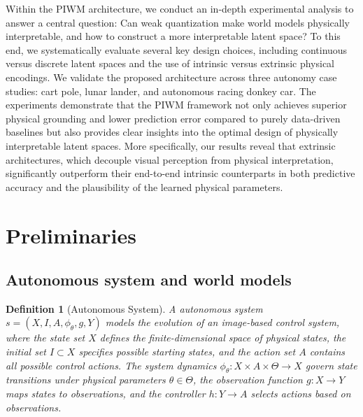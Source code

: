 \documentclass[sigconf]{acmart}
\newtheorem{definition}{Definition}
\begin{document}
Within the PIWM architecture, we conduct an in-depth experimental analysis to answer a central question: Can weak quantization make world models physically interpretable, and how to construct a more interpretable latent space? To this end, we systematically evaluate several key design choices, including continuous versus discrete latent spaces and the use of intrinsic versus extrinsic physical encodings.
We validate the proposed architecture across three autonomy case studies: cart pole, lunar lander, and autonomous racing donkey car. The experiments demonstrate that the PIWM framework not only achieves superior physical grounding and lower prediction error compared to purely data-driven baselines but also provides clear insights into the optimal design of physically interpretable latent spaces. More specifically, our results reveal that extrinsic architectures, which decouple visual perception from physical interpretation, significantly outperform their end-to-end intrinsic counterparts in both predictive accuracy and the plausibility of the learned physical parameters.

\section{Preliminaries}\label{sec:problem}

\subsection{Autonomous system and world models}
\begin{definition}[Autonomous System]
A \emph{autonomous system} $s = (X, I, A, \phi_{\theta}, g, Y)$ models the evolution of an image-based control system, where the state set $X$ defines the finite-dimensional space of physical states, the initial set $I \subset X$ specifies possible starting states, and the action set $A$ contains all possible control actions. The system dynamics $\phi_{\theta}: X \times A \times \Theta \rightarrow X$ govern state transitions under physical parameters $\theta \in \Theta$, the observation function $g: X \rightarrow Y$ maps states to observations, and the controller $h: Y \rightarrow A$ selects actions based on observations.
\end{definition}





 
\end{document}
